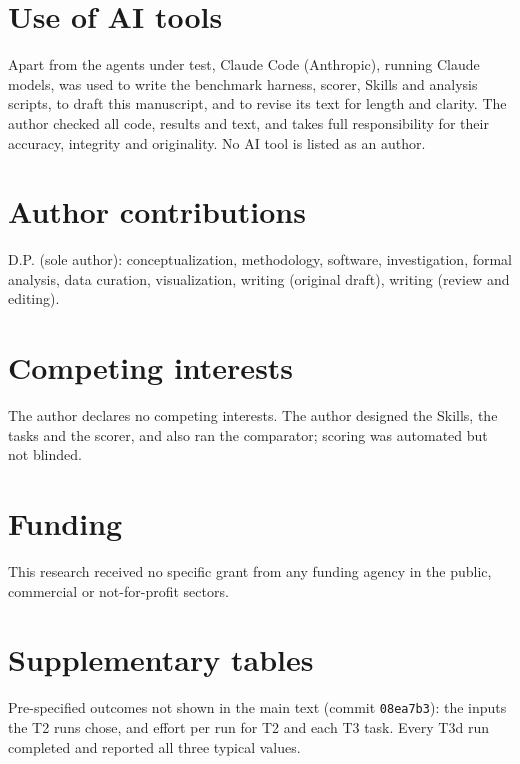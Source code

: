 \documentclass[11pt]{article}
\begin{document}
\section*{Use of AI tools}
Apart from the agents under test, Claude Code (Anthropic), running Claude models, was used to write the benchmark
harness, scorer, Skills and analysis scripts, to draft this manuscript, and to revise its text for length and clarity.
The author checked all code, results and text, and takes full responsibility for their accuracy, integrity and
originality. No AI tool is listed as an author.

\section*{Author contributions}
D.P. (sole author): conceptualization, methodology, software, investigation, formal analysis, data curation,
visualization, writing (original draft), writing (review and editing).

\section*{Competing interests}
The author declares no competing interests. The author designed the Skills, the tasks and the scorer, and also ran
the comparator; scoring was automated but not blinded.

\section*{Funding}
This research received no specific grant from any funding agency in the public, commercial or not-for-profit sectors.




\clearpage
\appendix
\section*{Supplementary tables}
\setcounter{table}{0}
\renewcommand{\thetable}{S\arabic{table}}
Pre-specified outcomes not shown in the main text (commit \texttt{08ea7b3}): the inputs the T2 runs chose, and effort
per run for T2 and each T3 task. Every T3d run completed and reported all three typical values.

\begin{table}[h]
\centering\small
\caption{T2: seeds and numbers of sampling times chosen by the runs (the prompt fixes neither).}
\label{tab:t2inputs}

\end{table}
\end{document}
